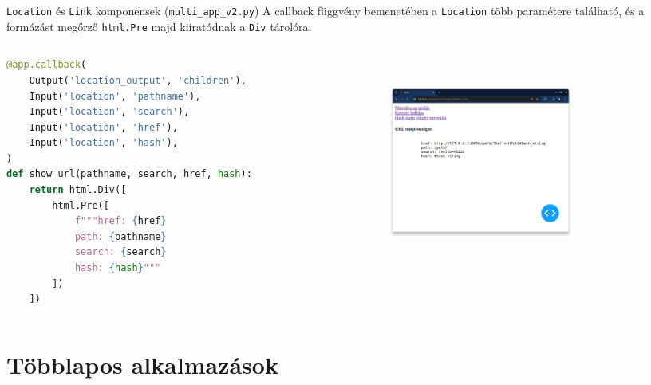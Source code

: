 \documentclass[english, aspectratio=169]{beamer}
\makeatletter
\let\origtableofcontents=\tableofcontents
\def\tableofcontents{\@ifnextchar[{\origtableofcontents}{\gobbletableofcontents}}
\def\gobbletableofcontents#1{\origtableofcontents}
\makeatother
\begin{document}
\begin{frame}[fragile]{\texttt{Location} és \texttt{Link} komponensek (\texttt{multi\_app\_v2.py})}
	A callback függvény bemenetében a \texttt{Location} több paramétere található, és a formázást megőrző \texttt{html.Pre} majd kiíratódnak a \texttt{Div} tárolóra. 
	\begin{columns}
		\begin{column}{.6\textwidth}
			\begin{lstlisting}[language=python]
@app.callback(
	Output('location_output', 'children'),
	Input('location', 'pathname'),
	Input('location', 'search'),
	Input('location', 'href'),
	Input('location', 'hash'),
)
def show_url(pathname, search, href, hash):
	return html.Div([
		html.Pre([
			f"""href: {href}
			path: {pathname}
			search: {search}
			hash: {hash}"""
		])
	])
			\end{lstlisting}
		\end{column}
		\begin{column}{.4\textwidth}
			\begin{center}
				\includegraphics[width=6cm, height=7cm, keepaspectratio]{images/adv_6.png}
			\end{center}
		\end{column}
	\end{columns}
\end{frame}

\section{Többlapos alkalmazások}

\begin{frame}{}
	\tableofcontents[currentsection]
\end{frame}
\end{document}
